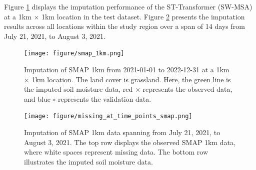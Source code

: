 \documentclass[11pt]{article}
\begin{document}
Figure \ref{fig: imputation_result} displays the imputation performance of the ST-Transformer (SW-MSA) at a 1km $\times$ 1km location in the test dataset.  Figure \ref{fig: missing_at_time_points_smap} presents the imputation results across all locations within the study region over a span of 14 days from July 21, 2021, to August 3, 2021.

\begin{figure}
\centering
\texttt{[image: figure/smap\_1km.png]}
\caption{Imputation of SMAP 1km from 2021-01-01 to 2022-12-31 at a 1km $\times$ 1km location. The land cover is grassland. Here, the green line is the imputed soil moisture data, red $\times$ represents the observed data, and blue $\circ$ represents the validation data.}
\label{fig: imputation_result}
\end{figure}

\begin{figure}[H]
\centering
\texttt{[image: figure/missing\_at\_time\_points\_smap.png]}
\caption{Imputation of SMAP 1km data spanning from July 21, 2021, to August 3, 2021. The top row displays the observed SMAP 1km data, where white spaces represent missing data. The bottom row illustrates the imputed soil moisture data.}
\label{fig: missing_at_time_points_smap} 
\end{figure}
\end{document}
